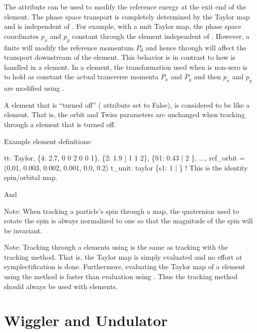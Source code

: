{The  attribute can be used to modify the reference energy at the exit end of the
 element. The phase space transport is completely determined by the Taylor map and is
independent of . For example, with a unit Taylor map, the phase space coordinates
$p_x$ and $p_y$ constant through the element independent of . However, a finite
 will modify the reference momentum $P_0$ and hence through  will affect the
transport downstream of the  element. This behavior is in contrast to how
 is handled in a  element. In a  element, the transformation
used when  is non-zero is to hold as constant the actual transverse momenta $P_x$
and $P_y$ and then $p_x$ and $p_y$ are modified using .

A  element that is ``turned off'' ( attribute set to False), is
considered to be like a  element. That is, the orbit and Twiss parameters are
unchanged when tracking through a  element that is turned off.

Example  element definitions:
\begin{example}
  tt: Taylor, \{4:  2.7, 0 0 2 0 0 1\}, \{2:  1.9 | 1 1 2\},
              \{S1: 0.43 | 2 \}, ..., 
              ref_orbit = (0.01, 0.003, 0.002, 0.001, 0.0, 0.2)
  t_unit: taylor \{s1: 1 | \}  ! This is the identity spin/orbital map.
\end{example}
And 

Note: When tracking a particle's spin through a map, the quaternion used to rotate the spin is
always normalized to one so that the magnitude of the spin will be invariant. 

Note: Tracking through a  elements using  is the same as
tracking with the  tracking method.  That is, the Taylor map is simply
evaluated and no effort at symplectification is done. Furthermore, evaluating the Taylor
map of a  element using the  method is faster than evaluation using
. Thus the  tracking method should always be used with
 elements.


\section{Wiggler and Undulator} 
\label{s:wiggler}

}
